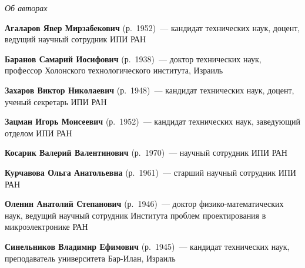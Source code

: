 \vspace*{-48pt}
\begin{center}\LARGE
\textit{Об авторах}
\end{center}
\thispagestyle{empty}

\vspace*{36pt}

\begin{multicols}{2}


\noindent
\textbf{Агаларов Явер Мирзабекович} (р.\ 1952)~---  кандидат технических наук,
доцент, ведущий научный сотрудник ИПИ РАН

\vspace*{5pt}

\noindent
\textbf{Баранов Самарий Иосифович} (р.\ 1938)~---  доктор технических наук, 
профессор Холонского технологического института, Израиль

\vspace*{5pt}

\noindent
\textbf{Захаров Виктор Николаевич} (р.\ 1948)~---   кандидат технических наук, 
доцент, ученый секретарь ИПИ РАН


\vspace*{5pt}

\noindent
\textbf{Зацман Игорь Моисеевич} (р.\ 1952)~---   кандидат технических наук, 
заведующий отделом ИПИ РАН

\vspace*{5pt}

\noindent
\textbf{Косарик Валерий Валентинович} (р.\ 1970)~---  научный сотрудник ИПИ РАН

\vspace*{5pt}

\noindent
\textbf{Курчавова Ольга Анатольевна} (р.\ 1961)~---  старший научный сотрудник ИПИ РАН

\vspace*{5pt}

\noindent
\textbf{Оленин Анатолий Степанович} (р.\ 1946)~---  доктор 
физико-математических наук, ведущий научный сотрудник Института проблем проектирования
в микроэлектронике РАН


\noindent
\textbf{Синельников Владимир Ефимович} (р.\ 1945)~---  кандидат технических наук, 
преподаватель университета Бар-Илан, Израиль

\vspace*{12pt}


\end{multicols}
